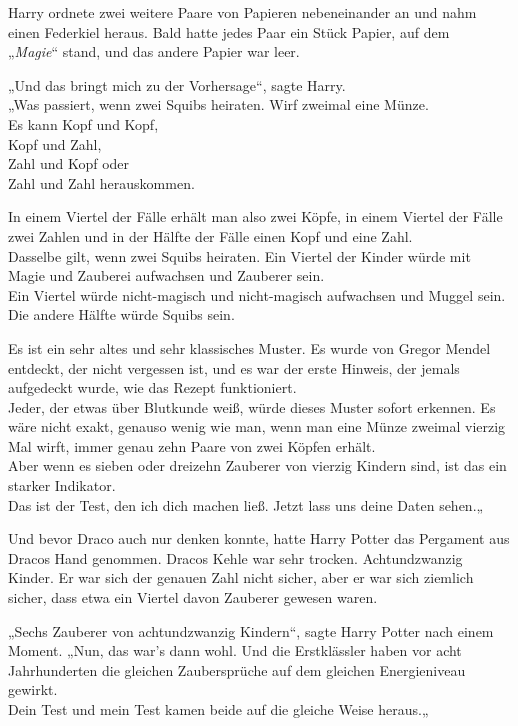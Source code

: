 {Harry ordnete zwei weitere Paare von Papieren nebeneinander an und nahm einen Federkiel heraus. Bald hatte jedes Paar ein Stück Papier, auf dem\\ „\emph{Magie}“ stand, und das andere Papier war leer.

„Und das bringt mich zu der Vorhersage“, sagte Harry.\\ „Was passiert, wenn zwei Squibs heiraten. Wirf zweimal eine Münze.\\ Es kann Kopf und Kopf,\\ Kopf und Zahl,\\ Zahl und Kopf oder\\ Zahl und Zahl herauskommen.

In einem Viertel der Fälle erhält man also zwei Köpfe, in einem Viertel der Fälle zwei Zahlen und in der Hälfte der Fälle einen Kopf und eine Zahl.\\ Dasselbe gilt, wenn zwei Squibs heiraten. Ein Viertel der Kinder würde mit Magie und Zauberei aufwachsen und Zauberer sein.\\ Ein Viertel würde nicht-magisch und nicht-magisch aufwachsen und Muggel sein. Die andere Hälfte würde Squibs sein.

Es ist ein sehr altes und sehr klassisches Muster. Es wurde von Gregor Mendel entdeckt, der nicht vergessen ist, und es war der erste Hinweis, der jemals aufgedeckt wurde, wie das Rezept funktioniert.\\ Jeder, der etwas über Blutkunde weiß, würde dieses Muster sofort erkennen. Es wäre nicht exakt, genauso wenig wie man, wenn man eine Münze zweimal vierzig Mal wirft, immer genau zehn Paare von zwei Köpfen erhält.\\ Aber wenn es sieben oder dreizehn Zauberer von vierzig Kindern sind, ist das ein starker Indikator.\\ Das ist der Test, den ich dich machen ließ. Jetzt lass uns deine Daten sehen.„

Und bevor Draco auch nur denken konnte, hatte Harry Potter das Pergament aus Dracos Hand genommen. Dracos Kehle war sehr trocken. Achtundzwanzig Kinder. Er war sich der genauen Zahl nicht sicher, aber er war sich ziemlich sicher, dass etwa ein Viertel davon Zauberer gewesen waren.

„Sechs Zauberer von achtundzwanzig Kindern“, sagte Harry Potter nach einem Moment. „Nun, das war's dann wohl. Und die Erstklässler haben vor acht Jahrhunderten die gleichen Zaubersprüche auf dem gleichen Energieniveau gewirkt.\\ Dein Test und mein Test kamen beide auf die gleiche Weise heraus.„

}
